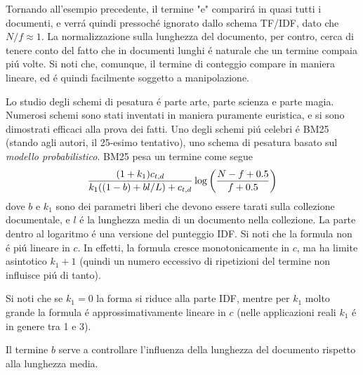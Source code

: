 Tornando all'esempio precedente, il termine "e" comparirá in quasi tutti i documenti, e verrá quindi pressoché ignorato dallo schema TF/IDF, dato che $N / f \approx 1$. La normalizzazione sulla lunghezza del documento, per contro, cerca di tenere conto del fatto che in documenti lunghi é naturale che un termine compaia piú volte. Si noti che, comunque, il termine di conteggio compare in maniera lineare, ed é quindi facilmente soggetto a manipolazione.

Lo studio degli schemi di pesatura é parte arte, parte scienza e parte magia. Numerosi schemi sono stati inventati in maniera puramente euristica, e si sono dimostrati efficaci alla prova dei fatti. Uno degli schemi piú celebri é BM25 (stando agli autori, il 25-esimo tentativo), uno schema di pesatura basato sul \textit{modello probabilistico}. BM25 pesa un termine come segue
\begin{equation*}
    \frac{(1 + k_1)c_{t, d}}{k_1((1 - b) + bl / L) + c_{t, d}}\log\left(\frac{N - f + 0.5}{f + 0.5}\right)
\end{equation*}
dove $b$ e $k_1$ sono dei parametri liberi che devono essere tarati sulla collezione documentale, e $l$ é la lunghezza media di un documento nella collezione. La parte dentro al logaritmo é una versione del punteggio IDF. Si noti che la formula non é piú lineare in $c$. In effetti, la formula cresce monotonicamente in $c$, ma ha limite asintotico $k_1 + 1$ (quindi un numero eccessivo di ripetizioni del termine non influisce piú di tanto).

Si noti che se $k_1 = 0$ la forma si riduce alla parte IDF, mentre per $k_1$ molto grande la formula é approssimativamente lineare in $c$ (nelle applicazioni reali $k_1$ é in genere tra 1 e 3).

Il termine $b$ serve a controllare l'influenza della lunghezza del documento rispetto alla lunghezza media.
